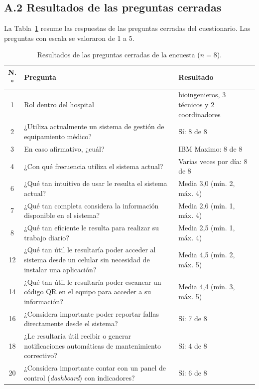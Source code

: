 \documentclass[10pt]{article}
\begin{document}
\subsection*{A.2 Resultados de las preguntas cerradas}

La Tabla~\ref{tab:encuesta-cerradas} resume las respuestas de las preguntas cerradas del cuestionario. Las preguntas con escala se valoraron de 1 a 5.

\begin{table}[H]
    \caption{Resultados de las preguntas cerradas de la encuesta ($n = 8$).}
    \label{tab:encuesta-cerradas}
    \centering
    \small
    \renewcommand{\arraystretch}{1.3}
    \begin{tabularx}{\textwidth}{c >{\raggedright\arraybackslash}X >{\raggedright\arraybackslash}p{4.6cm}}
        \toprule
        \textbf{N.°} & \textbf{Pregunta} & \textbf{Resultado} \\
        \midrule
        1  & Rol dentro del hospital & 3 bioingenieros, 3 técnicos y 2 coordinadores \\
        2  & ¿Utiliza actualmente un sistema de gestión de equipamiento médico? & Sí: 8 de 8 \\
        3  & En caso afirmativo, ¿cuál? & IBM Maximo: 8 de 8 \\
        4  & ¿Con qué frecuencia utiliza el sistema actual? & Varias veces por día: 8 de 8 \\
        6  & ¿Qué tan intuitivo de usar le resulta el sistema actual? & Media 3,0 (mín. 2, máx. 4) \\
        7  & ¿Qué tan completa considera la información disponible en el sistema? & Media 2,6 (mín. 1, máx. 4) \\
        8  & ¿Qué tan eficiente le resulta para realizar su trabajo diario? & Media 2,5 (mín. 1, máx. 4) \\
        12 & ¿Qué tan útil le resultaría poder acceder al sistema desde un celular sin necesidad de instalar una aplicación? & Media 4,5 (mín. 2, máx. 5) \\
        14 & ¿Qué tan útil le resultaría poder escanear un código QR en el equipo para acceder a su información? & Media 4,4 (mín. 3, máx. 5) \\
        16 & ¿Considera importante poder reportar fallas directamente desde el sistema? & Sí: 7 de 8 \\
        18 & ¿Le resultaría útil recibir o generar notificaciones automáticas de mantenimiento correctivo? & Sí: 4 de 8 \\
        20 & ¿Considera importante contar con un panel de control (\textit{dashboard}) con indicadores? & Sí: 6 de 8 \\
        \bottomrule
    \end{tabularx}
\end{table}
\end{document}
